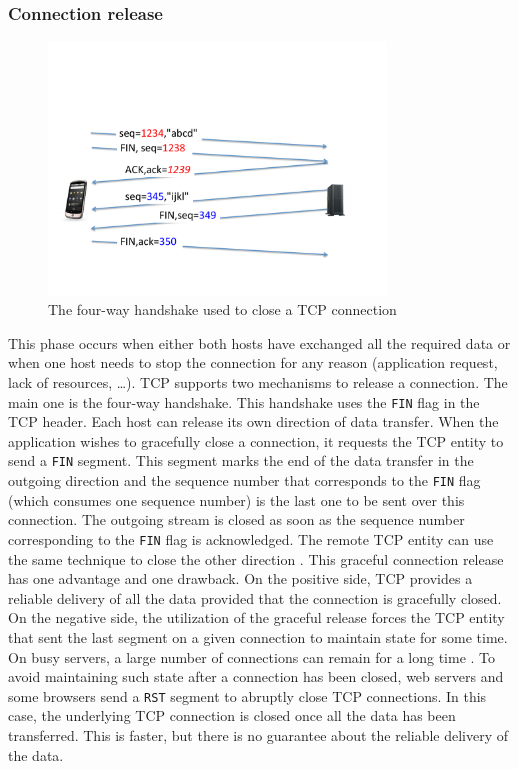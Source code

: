\subsubsection{Connection release}

\begin{figure}
\begin{center}
\includegraphics[width=0.8\textwidth]{figures/mptcp-ebook/Diapositive08.pdf}
\end{center}
\caption{The four-way handshake used to close a TCP connection}\label{fig:tcp-fin}
\end{figure}

This phase occurs when either both hosts have exchanged all the required data or when one host needs to stop the connection for any reason (application request, lack of resources, \ldots). TCP supports two mechanisms to release a connection. The main one is the four-way handshake. This handshake uses the \texttt{FIN} flag in the TCP header. Each host can release its own direction of data transfer. When the application wishes to gracefully close a connection, it requests the TCP entity to send a \texttt{FIN} segment. This segment marks the end of the data transfer in the outgoing direction and the sequence number that corresponds to the \texttt{FIN} flag (which consumes one sequence number) is the last one to be sent over this connection. The outgoing stream is closed as soon as the sequence number corresponding to the \texttt{FIN} flag is acknowledged. The remote TCP entity can use the same technique to close the other direction \cite{rfc793}. This graceful connection release has one advantage and one drawback. On the positive side, TCP provides a reliable delivery of all the data provided that the connection is gracefully closed. On the negative side, the utilization of the graceful release forces the TCP entity that sent the last segment on a given connection to maintain state for some time. On busy servers, a large number of connections can remain for a long time \cite{Faber_TimeWait:1999}. To avoid maintaining such state after a connection has been closed, web servers and some browsers send a \texttt{RST} segment to abruptly close TCP connections. In this case, the underlying TCP connection is closed once all the data has been transferred. This is faster, but there is no guarantee about the reliable delivery of the data. 


